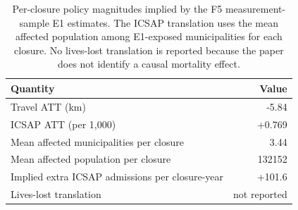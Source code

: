 \begin{table}[h!]
\centering
\caption{Per-closure policy magnitudes implied by the F5 measurement-sample E1 estimates. The ICSAP translation uses the mean affected population among E1-exposed municipalities for each closure. No lives-lost translation is reported because the paper does not identify a causal mortality effect.}
\label{tab:welfare-per-closure}
\small
\begin{tabular}{lr}
\toprule
Quantity & Value \\
\midrule
Travel ATT (km) & -5.84 \\
ICSAP ATT (per 1{,}000) & +0.769 \\
Mean affected municipalities per closure & 3.44 \\
Mean affected population per closure & 132152 \\
Implied extra ICSAP admissions per closure-year & +101.6 \\
Lives-lost translation & not reported \\
\bottomrule
\end{tabular}
\end{table}
